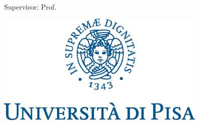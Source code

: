 \begin{titlepage}
    \begin{addmargin}[-1cm]{-3cm}
    \begin{center}
        \large

        \hfill

        \vfill

        \begingroup
            \color{CTtitle}\spacedallcaps{\myTitle} \\ \medskip
        \endgroup
        \mySubtitle \\ \bigskip

        \spacedlowsmallcaps{\myName} \\
        Supervisor: Prof. \mySupervisor

        \vfill

        \includegraphics[width=10cm]{gfx/marchio_unipi_pant541.eps} \\ \medskip

        \myDepartment \\
        \myUni \\ \bigskip

        \myTime\

        \vfill

    \end{center}
  \end{addmargin}
\end{titlepage}
